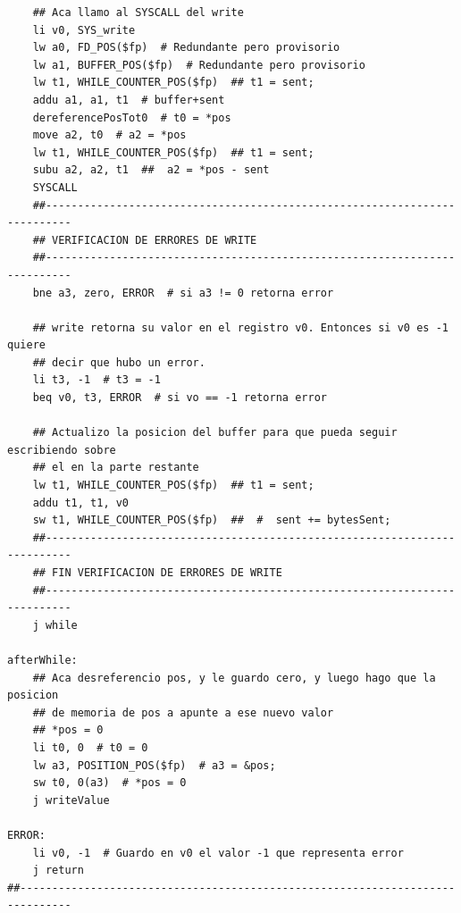 \documentclass[a4paper,10pt]{article}
\begin{document}
\begin{lstlisting}
    ## Aca llamo al SYSCALL del write
    li v0, SYS_write
    lw a0, FD_POS($fp)  # Redundante pero provisorio
    lw a1, BUFFER_POS($fp)  # Redundante pero provisorio
    lw t1, WHILE_COUNTER_POS($fp)  ## t1 = sent;
    addu a1, a1, t1  # buffer+sent
    dereferencePosTot0  # t0 = *pos
    move a2, t0  # a2 = *pos
    lw t1, WHILE_COUNTER_POS($fp)  ## t1 = sent;
    subu a2, a2, t1  ##  a2 = *pos - sent
    SYSCALL
    ##--------------------------------------------------------------------------
    ## VERIFICACION DE ERRORES DE WRITE
    ##--------------------------------------------------------------------------
    bne a3, zero, ERROR  # si a3 != 0 retorna error

    ## write retorna su valor en el registro v0. Entonces si v0 es -1 quiere
    ## decir que hubo un error.
    li t3, -1  # t3 = -1
    beq v0, t3, ERROR  # si vo == -1 retorna error

    ## Actualizo la posicion del buffer para que pueda seguir escribiendo sobre
    ## el en la parte restante
    lw t1, WHILE_COUNTER_POS($fp)  ## t1 = sent;
    addu t1, t1, v0
    sw t1, WHILE_COUNTER_POS($fp)  ##  #  sent += bytesSent;
    ##--------------------------------------------------------------------------
    ## FIN VERIFICACION DE ERRORES DE WRITE
    ##--------------------------------------------------------------------------
    j while

afterWhile:
    ## Aca desreferencio pos, y le guardo cero, y luego hago que la posicion
    ## de memoria de pos a apunte a ese nuevo valor
    ## *pos = 0
    li t0, 0  # t0 = 0
    lw a3, POSITION_POS($fp)  # a3 = &pos;
    sw t0, 0(a3)  # *pos = 0
    j writeValue

ERROR:
    li v0, -1  # Guardo en v0 el valor -1 que representa error
    j return
##------------------------------------------------------------------------------
            \end{lstlisting}
            
\end{document}

